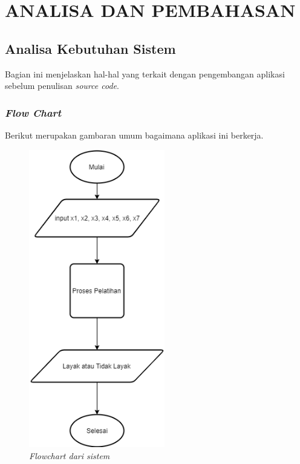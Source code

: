 
\chapter{ANALISA DAN PEMBAHASAN}                

\section{Analisa Kebutuhan Sistem}
 Bagian ini menjelaskan hal-hal yang terkait dengan pengembangan aplikasi sebelum penulisan \emph{source code}.
 \subsection{\emph{Flow Chart}}
 Berikut merupakan gambaran umum bagaimana aplikasi ini berkerja. 
 
 	\begin{figure}[H]
	 	\centering
	 	\includegraphics[height=13cm]{gambar/flowchart-jst}
	 	\caption{\emph{Flowchart dari sistem}}
	 	\label{JST-3}
	 \end{figure}
 
